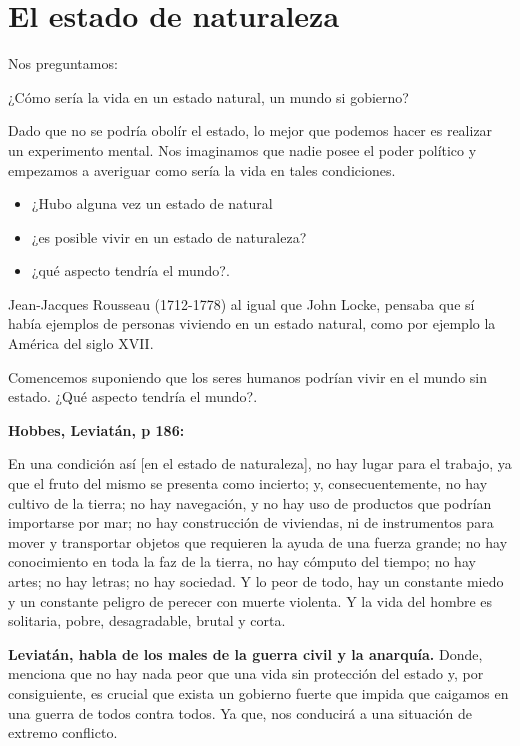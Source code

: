 \chapter{El estado de naturaleza}

Nos preguntamos:

\begin{center}
    ¿Cómo sería la vida en un estado natural, un mundo si gobierno?
\end{center}

Dado que no se podría obolír el estado, lo mejor que podemos hacer es realizar un experimento mental. Nos imaginamos que nadie posee el poder político y empezamos a averiguar como sería la vida en tales condiciones.

\begin{itemize}
    \item ¿Hubo alguna vez un estado de natural
    \item ¿es posible vivir en un estado de naturaleza? 
    \item ¿qué aspecto tendría el mundo?.
\end{itemize}

Jean-Jacques Rousseau (1712-1778) al igual que John Locke, pensaba que sí había ejemplos de personas viviendo en un estado natural, como por ejemplo la América del siglo XVII.

Comencemos suponiendo que los seres humanos podrían vivir en el mundo sin estado. ¿Qué aspecto tendría el mundo?.

\textbf{Hobbes, Leviatán, p 186:}

\begin{center}
    En una condición así [en el estado de naturaleza], no hay lugar para el trabajo, ya que el fruto del mismo se presenta como incierto; y, consecuentemente, no hay cultivo de la tierra; no hay navegación, y no hay uso de productos que podrían importarse por mar; no hay construcción de viviendas, ni de instrumentos para mover y transportar objetos que requieren la ayuda de una fuerza grande; no hay conocimiento en toda la faz de la tierra, no hay cómputo del tiempo; no hay artes; no hay letras; no hay sociedad. Y lo peor de todo, hay un constante miedo y un constante peligro de perecer con muerte violenta. Y la vida del hombre es solitaria, pobre, desagradable, brutal y corta.
\end{center}

\textbf{Leviatán, habla de los males de la guerra civil y la anarquía.} Donde, menciona que no hay nada peor que una vida sin protección del estado y, por consiguiente, es crucial que exista un gobierno fuerte que impida que caigamos en una guerra de todos contra todos. Ya que, nos conducirá a una situación de extremo conflicto.

